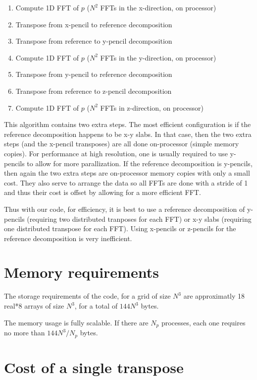 \documentclass[12pt]{article}
\begin{document}
\begin{enumerate}
\item Compute 1D FFT of $p$ ($N^2$ FFTs in the x-direction, on processor)
\item Transpose from x-pencil to reference decomposition 
\item Transpose from reference to y-pencil decomposition
\item Compute 1D FFT of $p$ ($N^2$ FFTs in the y-direction, on processor)
\item Transpose from y-pencil to reference decomposition
\item Transpose from reference to z-pencil decomposition
\item Compute 1D FFT of $p$ ($N^2$ FFTs in z-direction, on processor)
\end{enumerate}


This algorithm contains two extra steps.  The most efficient
configuration is if the reference decomposition happens to be x-y slabs.
In that case, then the two extra steps (and the x-pencil transposes)
are all done on-processor (simple memory copies).
For performance at high resolution, one is usually required to
use y-pencils to allow for more parallization.  
If the reference decomposition is y-pencils, then again the
two extra steps are on-processor memory copies with only 
a small cost.  They also serve to arrange the data so all
FFTs are done with a stride of 1 and thus their cost is offset
by allowing for a more efficient FFT.

Thus with our code, for efficiency, it is best to use a reference 
decomposition of y-pencils (requiring two distributed tranposes for
each FFT) or x-y slabs (requiring one distributed transpose for each FFT).  
Using x-pencils or z-pencils  for the reference decomposition is very inefficient.  


\section{Memory requirements}

The storage requirements of the code, for a grid of size $N^3$ 
are approximatly 18 real*8 arrays of size $N^3$, for a total
of $144 N^3$ bytes.  

The memory usage is fully scalable.  If there are $N_p$ processes,
each one requires no more than $144 N^3/N_p$ bytes.  


\section{Cost of a single transpose}
\end{document}

